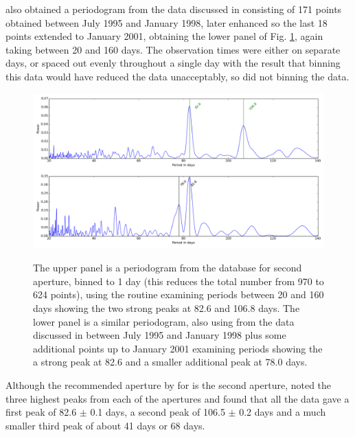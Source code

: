 {\FirstP} also obtained a periodogram from the {\hst} data discussed in \citealt{benedict92,benedict98} consisting of
171 points obtained between July 1995 and January 1998, later enhanced so the last 18 points extended to January 2001,
obtaining the lower panel of Fig. \ref{fig:asasexample}, again taking between 20 and 160 days. The observation times
were either on separate days, or spaced out evenly throughout a single day with the result that binning this data would
have reduced the data unacceptably, so {\Firstp} did not binning the {\hst} data.

\begin{figure}[!htbp]
\begin{center}
\includegraphics[scale=0.20]{Figures/asashstcomb.png} \\
\end{center}   
\caption{The upper panel is a periodogram from the {\asas} database for {\prox} second aperture, binned to 1 day
  (this reduces the total number from 970 to 624 points), using the {\gatspy} routine examining periods between 20 and
  160 days showing the two strong peaks at 82.6 and 106.8 days. The lower panel is a similar periodogram, also using
  {\gatspy} from the {\hst} data discussed in \citet{benedict98} between July 1995 and January 1998 plus some additional
  points up to January 2001 examining periods showing the a strong peak at 82.6 and a smaller additional peak at 78.0
  days.}
\protect\label{fig:asasexample}
\end{figure}

Although the recommended aperture by {\asas} for {\prox} is the second aperture, {\Firstp} noted the three highest peaks from
each of the apertures and found that all the data gave a first peak of 82.6 $\pm$ 0.1 days, a second peak of 106.5 $\pm$
0.2 days and a much smaller third peak of about 41 days or 68 days.

